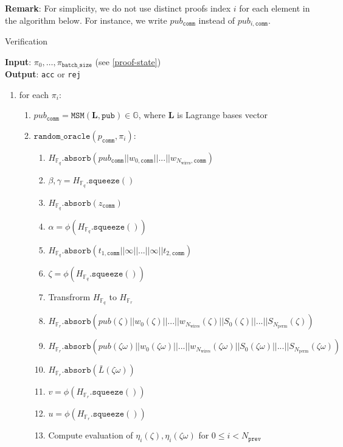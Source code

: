 \textbf{Remark}: For simplicity, we do not use distinct proofs index $i$ for each element in the algorithm below.
For instance, we write $pub_{\texttt{comm}}$ instead of $pub_{i, \texttt{comm}}$.
\begin{algorithm}[H]
\caption{Verification}
\textbf{Input}: $\pi_0, \dots, \pi_{\texttt{batch\_size}}$ (see \ref{proof-state}) \\
\textbf{Output}: \texttt{acc} or \texttt{rej}
\begin{enumerate}
	\item for each $\pi_i$:
	\begin{enumerate}
		\item $pub_{\texttt{comm}} = \texttt{MSM}(\textbf{L}, \texttt{pub}) \in \mathbb{G}$, where $\textbf{L}$ is Lagrange bases vector
		\item $\texttt{random\_oracle}(p_{\texttt{comm}}, \pi_i)$:
		\begin{enumerate}
			\item $H_{\mathbb{F}_q}.\texttt{absorb}(pub_{\texttt{comm}} || w_{0, \texttt{comm}} || ... || w_{N_{\text{wires}}, \texttt{comm}})$
			\item $\beta, \gamma = H_{\mathbb{F}_q}.\texttt{squeeze}()$
			\item $H_{\mathbb{F}_q}.\texttt{absorb}(z_{\texttt{comm}})$
			\item $\alpha = \phi(H_{\mathbb{F}_q}.\texttt{squeeze}())$
			\item $H_{\mathbb{F}_q}.\texttt{absorb}(t_{1, \texttt{comm}} || \infty || ... || \infty || t_{2, \texttt{comm}})$
			\item $\zeta = \phi(H_{\mathbb{F}_q}.\texttt{squeeze}())$
			\item Transfrorm $H_{\mathbb{F}_q}$ to $H_{\mathbb{F}_r}$
			\item $H_{\mathbb{F}_r}.\texttt{absorb}(pub(\zeta) || w_{0}(\zeta) || ... || w_{N_{\text{wires}}}(\zeta) 
				|| S_0(\zeta) || ... || S_{N_{\text{perm}}}(\zeta))$
			\item $H_{\mathbb{F}_r}.\texttt{absorb}(pub(\zeta\omega) || w_{0}(\zeta\omega) || ... || w_{N_{\text{wires}}}(\zeta\omega) 
				|| S_0(\zeta\omega) || ... || S_{N_{\text{perm}}}(\zeta\omega))$
			\item $H_{\mathbb{F}_r}.\texttt{absorb}(\bar{L}(\zeta\omega))$
			\item $v = \phi(H_{\mathbb{F}_r}.\texttt{squeeze}())$
			\item $u = \phi(H_{\mathbb{F}_r}.\texttt{squeeze}())$
			\item Compute evaluation of $\eta_i(\zeta), \eta_i(\zeta\omega)$ for $0 \leq i < N_{\texttt{prev}}$

\end{enumerate}
\end{enumerate}
\end{enumerate}
\end{algorithm}
